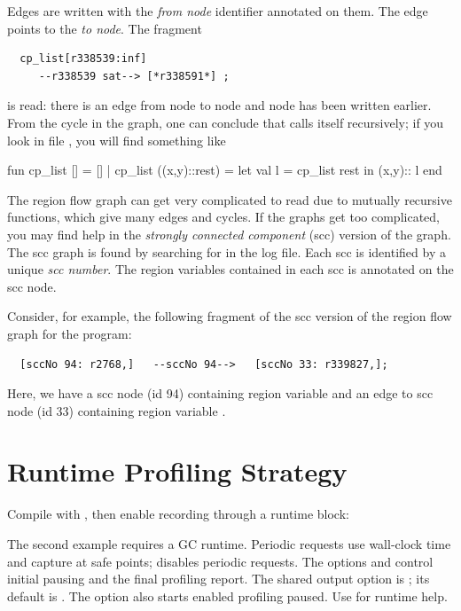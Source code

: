 \documentclass[12pt]{book}
\begin{document}
Edges are written with the \emph{from node} identifier annotated on them. The
edge points to the \emph{to node}. The fragment {\small
\begin{verbatim}
  cp_list[r338539:inf]
     --r338539 sat--> [*r338591*] ;
\end{verbatim}
}
is read: there is an edge from node  to node  and node
 has been written earlier. From the cycle in the graph, one can
conclude that  calls itself recursively; if you look in file
, you will find something like
\begin{smlcode}
  fun cp_list [] = []
    | cp_list ((x,y)::rest) =
          let val l = cp_list rest
          in (x,y):: l
          end
\end{smlcode}

The region flow graph can get very complicated to read due to mutually recursive
functions, which give many edges and cycles.  If the graphs get too complicated,
you may find help in the
%
%
%
\emph{strongly connected component} (scc) version of the graph.  The scc graph
is found by searching for \kw{[sccNo} in the log file.  Each scc is identified
  by a unique \emph{scc number}. The region variables contained in each scc is
  annotated on the scc node.

Consider, for example, the following fragment of the scc version of
the region flow graph for the  program:
{\small
\begin{verbatim}
  [sccNo 94: r2768,]   --sccNo 94-->   [sccNo 33: r339827,];
\end{verbatim}
}
Here, we have a scc node (id 94) containing region variable  and an
edge to scc node (id 33) containing region variable .

\section{Runtime Profiling Strategy}
Compile with , then enable recording through a runtime block:
The second example requires a GC runtime. Periodic requests use wall-clock
time and capture at safe points;  disables periodic
requests. The options  and  control initial
pausing and the final profiling report. The shared output option is
; its default is . The option
 also starts enabled profiling paused. Use  for runtime help.
\end{document}
